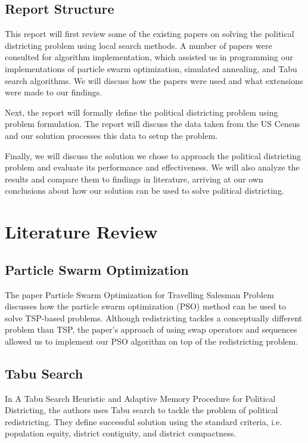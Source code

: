 \documentclass[journal]{IEEEtran}
\begin{document}
\subsection{Report Structure}
This report will first review some of the existing papers on solving the
political districting problem using local search methods. A number of
papers were consulted for algorithm implementation, which assisted us
in programming our implementations of particle swarm optimization, simulated
annealing, and Tabu search algorithms. We will discuss how the papers were
used and what extensions were made to our findings.

Next, the report will formally define the political districting problem using
problem formulation. The report will discuss the data taken from the US Census
and our solution processes this data to setup the problem.

Finally, we will discuss the solution we chose to approach the political
districting problem and evaluate its performance and effectiveness. We will
also analyze the results and compare them to findings in literature, arriving
at our own conclusions about how our solution can be used to solve political
districting.

\section{Literature Review}
\subsection{Particle Swarm Optimization}
The paper Particle Swarm Optimization for Travelling Salesman Problem\cite{tsp-pso}
discusses how the particle swarm optimization (PSO) method can be used to
solve TSP-based problems. Although redistricting tackles a conceptually
different problem than TSP, the paper’s approach of using swap operators
and sequences allowed us to implement our PSO algorithm on top of the
redistricting problem.

\subsection{Tabu Search}
In A Tabu Search Heuristic and Adaptive Memory Procedure for Political
Districting\cite{local-search}, the authors uses Tabu search to tackle the problem of
political redistricting. They define successful solution using the standard
criteria, i.e. population equity, district contiguity, and district compactness.
\end{document}
